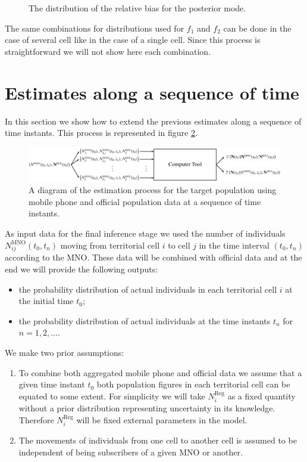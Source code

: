 \documentclass[12pt, a4paper]{article}
\begin{document}
\begin{figure}
\centering
\caption{The distribution of the relative bias for the posterior mode.}
\label{manycellssmode} 	
\end{figure}


The same combinations for distributions used for $f_{1}$ and $f_{2}$ can be done in the case of several cell like in
the case of a single cell. Since this process is straightforward we will not show here each combination.


\section{Estimates along a sequence of time}

In this section we show how to extend the previous estimates along a sequence of time instants. 
This process is represented in figure \ref{Tool2}.

\begin{figure}[htbp]
	\centering
	\includegraphics[scale=0.35]{Tool2.png}
	\caption{A diagram of the estimation process for the target population using mobile phone and official 
		population data at a sequence of time instants.}
	\label{Tool2} 
\end{figure}

As input data for the final inference stage we used the number of individuals $N_{ij}^{\textrm{MNO}}(t_{0}, t_{n})$ moving 
from territorial cell $i$ to cell $j$ in the time interval $(t_{0}, t_{n})$ according to the MNO. These data will be combined 
with official data and at the end we will  provide the following outputs:

\begin{itemize}
	\item the probability distribution of actual individuals in each territorial cell $i$ at the initial time $t_{0}$;
	\item the probability distribution of actual individuals at the time instants $t_{n}$ for $n=1,2,\dots$.
\end{itemize}  

We make two prior assumptions:

\begin{enumerate}
	\item To combine both aggregated mobile phone and official data we assume that a given time instant $t_{0}$ 
	both population figures in each territorial cell can be equated to some extent. For simplicity we will take $N_{i}^{\textrm{Reg}}$ 
	as a fixed quantity without a prior distribution representing uncertainty in its knowledge. 
	Therefore $N_{i}^{\textrm{Reg}}$ will be fixed external parameters in the model. 
	\item The movements of individuals from one cell to another cell is assumed to be independent of 
	being subscribers of a given MNO or another.
\end{enumerate}
\end{document}
